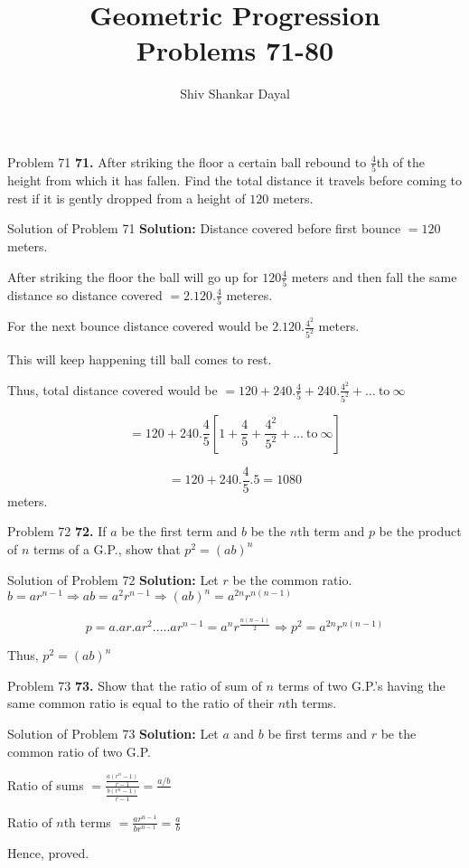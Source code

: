 \documentclass[aspectratio=1610,8pt]{beamer}
\title{Geometric Progression\\Problems 71-80}
\author[Shiv Shankar Dayal]{Shiv Shankar Dayal}
\begin{document}
\begin{frame}
  \titlepage
\end{frame}
\begin{frame}{Problem 71}
  \textbf{71.} After striking the floor a certain ball rebound to $\frac{4}{5}$th of the height from which it has fallen. Find the
  total distance it travels before coming to rest if it is gently dropped from a height of $120$ meters.
\end{frame}
\begin{frame}{Solution of Problem 71}
  \textbf{Solution:} Distance covered before first bounce $= 120$ meters.

  After striking the floor the ball will go up for $120\frac{4}{5}$ meters and then fall the same distance so distance covered $=
  2.120.\frac{4}{5}$ meteres.

  For the next bounce distance covered would be $2.120.\frac{4^2}{5^2}$ meters.

  This will keep happening till ball comes to rest.

  Thus, total distance covered would be $= 120 + 240.\frac{4}{5} + 240.\frac{4^2}{5^2} + \ldots~\text{to}~\infty$

  $$= 120 + 240.\frac{4}{5}\left[1 + \frac{4}{5} + \frac{4^2}{5^2} + \ldots~\text{to}~\infty\right]$$

  $$= 120 + 240.\frac{4}{5}.5 = 1080$$ meters.
\end{frame}
\begin{frame}{Problem 72}
  \textbf{72.} If $a$ be the first term and $b$ be the $n$th term and $p$ be the product of $n$ terms of a G.P., show that $p^2 =
  (ab)^n$
\end{frame}
\begin{frame}{Solution of Problem 72}
  \textbf{Solution:} Let $r$ be the common ratio. $b = ar^{n - 1} \Rightarrow ab = a^2r^{n - 1}\Rightarrow (ab)^n = a^{2n}r^{n(n - 1)}$

  $$p = a.ar.ar^2.\ldots.ar^{n - 1} = a^nr^{\frac{n(n - 1)}{2}} \Rightarrow p^2 = a^{2n}r^{n(n - 1)}$$

  Thus, $p^2 = (ab)^n$
\end{frame}
\begin{frame}{Problem 73}
  \textbf{73.} Show that the ratio of sum of $n$ terms of two G.P.'s having the same common ratio is equal to the ratio of their
  $n$th terms.
\end{frame}
\begin{frame}{Solution of Problem 73}
  \textbf{Solution:} Let $a$ and $b$ be first terms and $r$ be the common ratio of two G.P.

  Ratio of sums $= \frac{\frac{a(r^n - 1)}{r - 1}}{\frac{b(r^n - 1)}{r - 1}} = \frac{a/b}{}$

  Ratio of $n$th terms $= \frac{ar^{n - 1}}{br^{n - 1}} = \frac{a}{b}$

  Hence, proved.
\end{frame}
\end{document}
